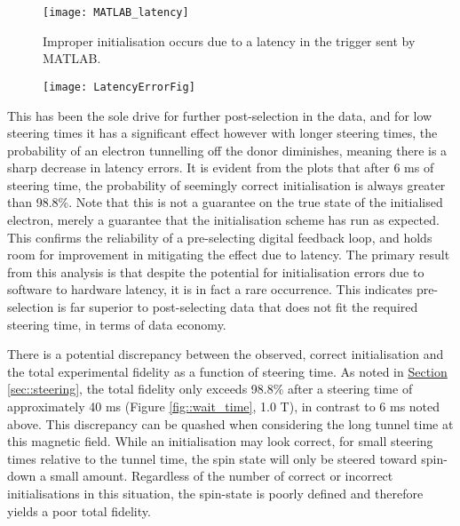 	\begin{figure}[htbp!]
		\centering
		\texttt{[image: MATLAB\_latency]}
		\caption{Improper initialisation occurs due to a latency in the trigger sent by MATLAB.}
		\label{fig::latency}
	\end{figure}
	
	\begin{figure}[htb!]
		\centering
		\texttt{[image: LatencyErrorFig]}
		\caption{}
		\label{fig::latency_errors}
	\end{figure}
	
	This has been the sole drive for further post-selection in the data, and for low steering times it has a significant effect however with longer steering times, the probability of an electron tunnelling off the donor diminishes, meaning there is a sharp decrease in latency errors. It is evident from the plots that after 6 ms of steering time, the probability of seemingly correct initialisation  is always greater than 98.8\%. Note that this is not a guarantee on the true state of the initialised electron, merely a guarantee that the initialisation scheme has run as expected. This confirms the reliability of a pre-selecting digital feedback loop, and holds room for improvement in mitigating the effect due to latency. The primary result from this analysis is that despite the potential for initialisation errors due to software to hardware latency, it is in fact a rare occurrence. This indicates pre-selection is far superior to post-selecting data that does not fit the required steering time, in terms of data economy. 
	
	There is a potential discrepancy between the observed, correct initialisation and the total experimental fidelity as a function of steering time. As noted in \hyperref[sec::steering]{Section \ref{sec::steering}}, the total fidelity only exceeds 98.8\% after a steering time of approximately 40 ms (Figure \ref{fig::wait_time}, 1.0 T), in contrast to 6 ms noted above. This discrepancy can be quashed when considering the long tunnel time at this magnetic field. While an initialisation may look correct, for small steering times relative to the tunnel time, the spin state will only be steered toward spin-down a small amount. Regardless of the number of correct or incorrect initialisations in this situation, the spin-state is poorly defined and therefore yields a poor total fidelity.
	